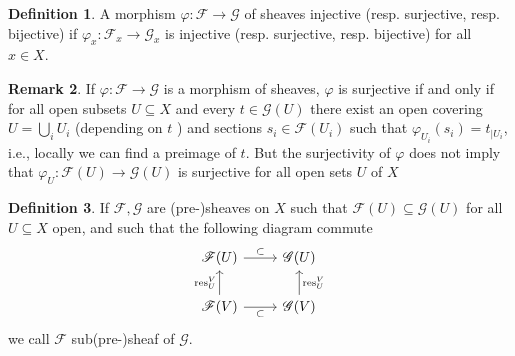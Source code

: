 \documentclass[12pt,a4paper]{book}
\theoremstyle{definition}
\newtheorem{defn}{Definition}[section]
\newtheorem{rema}[defn]{Remark}
\begin{document}
\begin{defn}
    A morphism $\varphi: \mathscr{F} \rightarrow \mathscr{G}$ of sheaves injective (resp. surjective, resp. bijective) if $\varphi_x: \mathscr{F}_x \rightarrow \mathscr{G}_x$ is injective (resp. surjective, resp. bijective) for all $x \in X$.
\end{defn}
\begin{rema}
    If $\varphi: \mathscr{F} \rightarrow \mathscr{G}$ is a morphism of sheaves, $\varphi$ is surjective if and only if for all open subsets $U \subseteq X$ and every $t \in \mathscr{G}(U)$ there exist an open covering $U=\bigcup_i U_i$ (depending on $t$ ) and sections $s_i \in \mathscr{F}\left(U_i\right)$ such that $\varphi_{U_i}\left(s_i\right)=t_{\mid U_i}$, i.e., locally we can find a preimage of $t$. But the surjectivity of $\varphi$ does not imply that $\varphi_U: \mathscr{F}(U) \rightarrow \mathscr{G}(U)$ is surjective for all open sets $U$ of $X$
\end{rema}
\begin{defn}
    If $\mathscr{F}, \mathscr{G}$ are (pre-)sheaves on $X$ such that $\mathscr{F}(U) \subseteq \mathscr{G}(U)$ for all $U \subseteq X$ open, and such that the following diagram commute
    \[\begin{tikzcd}
            {\mathscr{F}(U)} & {\mathscr{G}(U)} \\
            {\mathscr{F}(V)} & {\mathscr{G}(V)}
            \arrow["\subset", from=1-1, to=1-2]
            \arrow["{\text{res}_U^V}", from=2-1, to=1-1]
            \arrow["\subset"', from=2-1, to=2-2]
            \arrow["{\text{res}_U^V}"', from=2-2, to=1-2]
        \end{tikzcd}\]
    we call $\mathscr{F}$ sub(pre-)sheaf of $\mathscr{G}$.
\end{defn}
\end{document}
